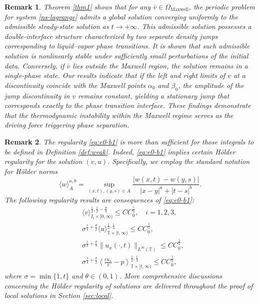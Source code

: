 \documentclass[a4paper,oneside,11pt]{article}
\numberwithin{equation}{section}
\newtheorem{remark}{Remark}[section]
\begin{document}
\begin{remark}
Theorem \ref{thm1} shows that for any $\bar v \in \Omega_{\mathrm{Maxwell}}$, the periodic problem for system \eqref{ns-lagrange} admits a global solution converging uniformly to the admissible steady-state solution as $t\to+\infty$.  This admissible solution possesses a double-interface structure characterized by two separate density jumps corresponding to liquid–vapor phase transitions. It is shown that such admissible solution is nonlinearly stable under sufficiently small perturbations of the initial data.
Conversely, if $\bar v$ lies outside the Maxwell region, the solution remains in a single-phase state.
Our results indicate that if the left and right limits of $v$ at a discontinuity coincide with the Maxwell points $\alpha_0$ and $\beta_0$, the amplitude of the jump discontinuity in $v$ remains constant, yielding a stationary jump that corresponds exactly to the phase transition interface. 
These findings demonstrate that the thermodynamic instability within the Maxwell regime serves as the driving force triggering phase separation.
\end{remark}

\begin{remark}\label{rem:1}
The regularity \eqref{eq:e0-b1} is more than sufficient for those integrals to be defined in Definition \ref{def:weak}. Indeed, \eqref{eq:e0-b1} implies certain H\"older regularity for the solution \((v,u)\). Specifically, we employ the standard notation for H\"older norms
\[\langle w\rangle_A^{a,b}=\sup_{(x,t),(y,s)\in A}\frac{|w(x,t)-w(y,s)|}{|x-y|^a+|t-s|^b}.\]
The following regularity results are consequences of \eqref{eq:e0-b1}:
	\begin{align}
		&\langle v\rangle_{I_i\times[0,\infty)}^{\frac{1}{2},\frac{1}{2}-\frac{\theta}{4}}\leq CC_{0}^{\frac{1}{2}},\quad i=1,2,3,\label{eq:thm1-v1}	\\	
		&\sigma^{\frac{1}{4}+\frac{\theta}{2}}\langle u\rangle_{\mathbb{T}\times[t,\infty)}^{\frac{1}{2},\frac{1}{4}} \leq CC_{0}^{\frac12},\label{eq:thm1-u1} \\
		&\sigma^{\frac{1}{2}+\frac{\theta}{4}}\|u_{x}(\cdot,t)\|_{L^{\infty}(\mathbb{T})} \leq CC_{0}^{\frac{1}{2}}, \label{eq:thm1-u2}\\
		&\sigma^{\frac{3}{4}+\frac{\theta}{2}}\left\langle\frac{\epsilon u_{x}}{v}-p\right\rangle_{\mathbb{T}\times[t,\infty)}^{\frac{1}{2},\frac{1}{4}} \leq CC_{0}^{\frac12},\label{eq:thm1-up}
	\end{align}
where $\sigma = \min\{1, t\}$ and $\theta \in (0,1)$. More comprehensive discussions concerning the H\"older regularity of solutions are delivered throughout the proof of local solutions in Section \ref{sec:local}.
\end{remark}
\end{document}
